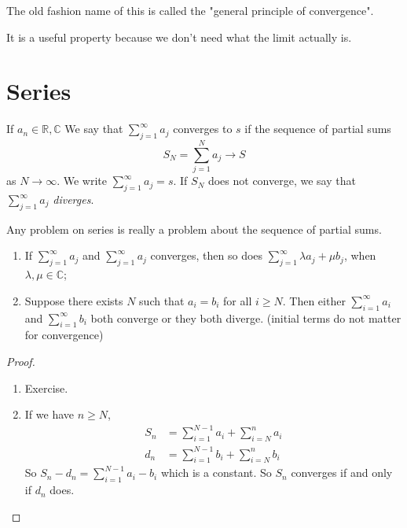 The old fashion name of this is called the "general principle of convergence".

It is a useful property because we don't need what the limit actually is.
\section{Series}
\begin{definition}
    If \(a_n \in \mathbb{R},\mathbb{C}\) We say that \(\sum\limits_{j=1}^{\infty} a_j\) converges to \(s\) if the sequence of partial sums
    \[
        S_{N} = \sum\limits_{j=1}^{N} a_j \to S
    \]
    as \(N \to \infty\). We write \(\sum\limits_{j=1}^{\infty} a_j = s\). If \(S_N\) does not converge, we say that \(\sum\limits_{j=1}^{\infty} a_j\) \textit{diverges}.
\end{definition}
\begin{remark}
    Any problem on series is really a problem about the sequence of partial sums.
\end{remark}
\begin{lemma}
    \leavevmode
    \begin{enumerate}
        \item If \(\sum\limits_{j=1}^{\infty} a_j\) and \(\sum\limits_{j=1}^{\infty} a_j\) converges, then so does \(\sum\limits_{j=1}^{\infty} \lambda a_j + \mu b_j\), when \(\lambda,\mu \in \mathbb{C}\);
        \item Suppose there exists \(N\) such that \(a_i = b_i\) for all \(i \geq  N\). Then either \(\sum\limits_{i=1}^{\infty} a_i\) and \(\sum\limits_{i=1}^{\infty} b_i\) both converge or they both diverge. (initial terms do not matter for convergence)
    \end{enumerate}
\end{lemma}
\begin{proof}
    \begin{enumerate}
        \item Exercise.
        \item If we have \( n\geq N\),
        \begin{align*}
            S_n &=\sum\limits_{i=1}^{N-1} a_i + \sum\limits_{i=N}^{n} a_i\\
            d_n &=\sum\limits_{i=1}^{N-1} b_i + \sum\limits_{i=N}^{n} b_i
        \end{align*}
        So \(S_n - d_n = \sum\limits_{i=1}^{N-1} a_i - b_i\) which is a constant. So \(S_n\) converges if and only if \(d_n\) does.
    \end{enumerate}
\end{proof}